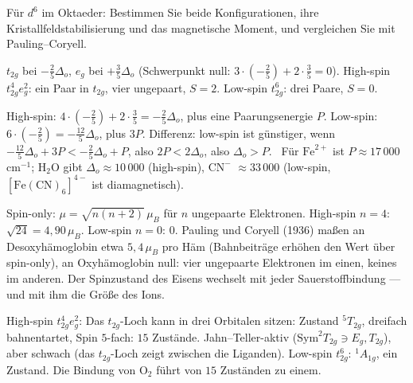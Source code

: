 \begin{aufgabe}
Für $d^{6}$ im Oktaeder: Bestimmen Sie beide Konfigurationen, ihre Kristallfeldstabilisierung und das magnetische Moment, und vergleichen Sie mit Pauling--Coryell.

\loesung
{}
$t_{2g}$ bei $-\frac25\Delta_o$, $e_g$ bei $+\frac35\Delta_o$ (Schwerpunkt null: $3\cdot(-\frac25) + 2\cdot\frac35 = 0$). High-spin $t_{2g}^{4}e_g^{2}$: ein Paar in $t_{2g}$, vier ungepaart, $S = 2$. Low-spin $t_{2g}^{6}$: drei Paare, $S = 0$.

High-spin: $4\cdot(-\frac25) + 2\cdot\frac35 = -\frac25\Delta_o$, plus eine Paarungsenergie $P$. Low-spin: $6\cdot(-\frac25) = -\frac{12}5\Delta_o$, plus $3P$. Differenz: low-spin ist günstiger, wenn $-\frac{12}5\Delta_o + 3P < -\frac25\Delta_o + P$, also $2P < 2\Delta_o$, also $\Delta_o > P$. \checkmark\ Für $\mathrm{Fe}^{2+}$ ist $P\approx17\,000$ cm$^{-1}$; $\mathrm{H_2O}$ gibt $\Delta_o\approx10\,000$ (high-spin), $\mathrm{CN^{-}}$ $\approx33\,000$ (low-spin, $[\mathrm{Fe(CN)_6}]^{4-}$ ist diamagnetisch).

Spin-only: $\mu = \sqrt{n(n + 2)}\,\mu_B$ für $n$ ungepaarte Elektronen. High-spin $n = 4$: $\sqrt{24} = 4{,}90\,\mu_B$. Low-spin $n = 0$: $0$. Pauling und Coryell (1936) maßen an Desoxyhämoglobin etwa $5{,}4\,\mu_B$ pro Häm (Bahnbeiträge erhöhen den Wert über spin-only), an Oxyhämoglobin null: vier ungepaarte Elektronen im einen, keines im anderen. Der Spinzustand des Eisens wechselt mit jeder Sauerstoffbindung --- und mit ihm die Größe des Ions.

High-spin $t_{2g}^{4}e_g^{2}$: Das $t_{2g}$-Loch kann in drei Orbitalen sitzen: Zustand ${}^{5}T_{2g}$, dreifach bahnentartet, Spin $5$-fach: $15$ Zustände. Jahn--Teller-aktiv ($\mathrm{Sym}^{2}T_{2g}\ni E_g, T_{2g}$), aber schwach (das $t_{2g}$-Loch zeigt zwischen die Liganden). Low-spin $t_{2g}^{6}$: ${}^{1}A_{1g}$, ein Zustand. Die Bindung von $\mathrm{O_2}$ führt von $15$ Zuständen zu einem.

\begin{center}
\begin{minipage}{0.88\textwidth}
\end{minipage}
\end{center}
\end{aufgabe}

